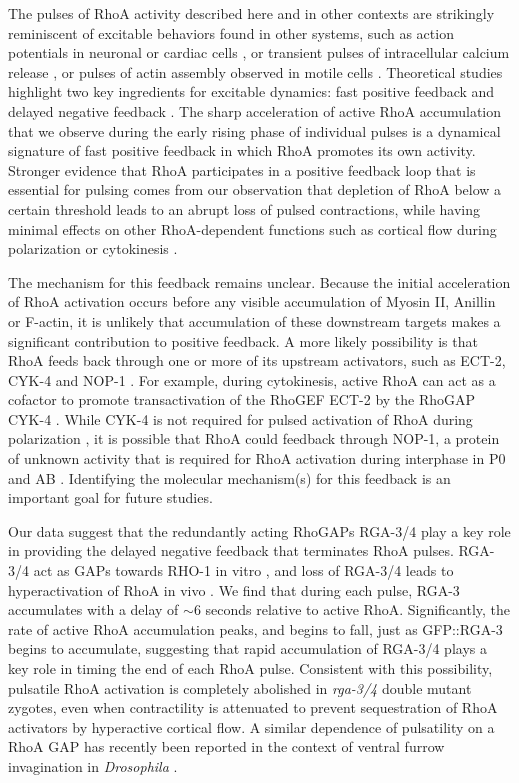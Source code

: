The pulses of RhoA activity described here and in other contexts  \cite{Munjal:2015bx, Bement:2015jp, Mason:2016bs} are strikingly reminiscent of excitable behaviors found in other systems, such as action potentials in neuronal  \cite{Izhikevich:2007aa} or cardiac cells  \cite{Luo:1991vz}, or transient pulses of intracellular calcium release  \cite{Goldbeter:1996aa}, or pulses of actin assembly observed in motile cells  \cite{Weiner:2007cl}. Theoretical studies highlight two key ingredients for excitable dynamics: fast positive feedback and delayed negative feedback  \cite{Strogatz:1994tz}. The sharp acceleration of active RhoA accumulation that we observe during the early rising phase of individual pulses is a dynamical signature of fast positive feedback in which RhoA promotes its own activity. Stronger evidence that RhoA participates in a positive feedback loop that is essential for pulsing comes from our observation that depletion of RhoA below a certain threshold leads to an abrupt loss of pulsed contractions, while having minimal effects on other RhoA-dependent functions such as cortical flow during polarization \cite{Motegi:2006hi, Schonegg:2006ed} or cytokinesis  \cite{Loria:2012ks}. 

The mechanism for this feedback remains unclear.  Because the initial acceleration of RhoA activation occurs before any visible accumulation of Myosin II, Anillin or F-actin, it is unlikely that accumulation of these downstream targets makes a significant contribution to positive feedback.  A more likely possibility is that RhoA feeds back through one or more of its upstream activators, such as ECT-2, CYK-4 and NOP-1  \cite{Tse:2012fp}.  For example, during cytokinesis, active RhoA can act as a cofactor to promote transactivation of the RhoGEF ECT-2 by the RhoGAP CYK-4  \cite{Zhang:2015bx}.  While CYK-4 is not required for pulsed activation of RhoA during polarization  \cite{Tse:2012fp}, it is possible that RhoA could feedback through NOP-1, a protein of unknown activity that is required for RhoA activation during interphase in P0 and AB  \cite{Tse:2012fp}. Identifying the molecular mechanism(s) for this feedback is an important goal for future studies.


Our data suggest that the redundantly acting RhoGAPs RGA-3/4 play a key role in providing the delayed negative feedback that terminates RhoA pulses. RGA-3/4 act as GAPs towards RHO-1 in vitro  \cite{Schonegg:2007if}, and loss of RGA-3/4 leads to hyperactivation of RhoA in vivo  \cite{Tse:2012fp}.  We find that during each pulse, RGA-3 accumulates with a delay of $\sim$6 seconds relative to active RhoA. Significantly, the rate of active RhoA accumulation peaks, and begins to fall, just as GFP::RGA-3 begins to accumulate, suggesting that rapid accumulation of RGA-3/4 plays a key role in timing the end of each RhoA pulse. Consistent with this possibility, pulsatile RhoA activation is completely abolished in \textit{rga-3/4} double mutant zygotes, even when contractility is attenuated to prevent sequestration of RhoA activators by hyperactive cortical flow.  A similar dependence of pulsatility on a RhoA GAP has recently been reported in the context of ventral furrow invagination in \textit{Drosophila}  \cite{Mason:2016bs}.

